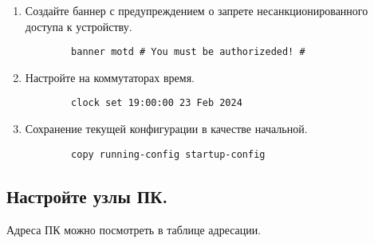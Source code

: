 \begin{enumerate}[a]
    \item Создайте баннер с предупреждением о запрете несанкционированного доступа к устройству.
    \begin{verbatim}
        banner motd # You must be authorizeded! #
    \end{verbatim}

    \item Настройте на коммутаторах время.
    \begin{verbatim}
        clock set 19:00:00 23 Feb 2024
    \end{verbatim}

    \item Сохранение текущей конфигурации в качестве начальной.
    \begin{verbatim}
        copy running-config startup-config
    \end{verbatim}
\end{enumerate}

\subsection{Настройте узлы ПК.}
Адреса ПК можно посмотреть в таблице адресации.